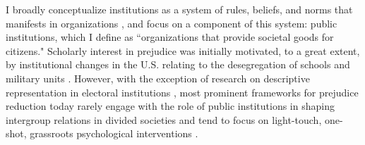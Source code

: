 \documentclass[12pt]{article}
\theoremstyle{plain}
\begin{document}






I broadly conceptualize institutions as a system of rules, beliefs, and norms that manifests in organizations \citep{Greif:2006vz}, and focus on a component of this system: public institutions, which I define as ``organizations that provide societal goods for citizens." Scholarly interest in prejudice was initially motivated, to a great extent, by institutional changes in the U.S. relating to the desegregation of schools and military units \citep{Allport1954}. However, with the exception of research on descriptive representation in electoral institutions \citep{Chauchard:2014aa,Chauchard:2017aa}, most prominent frameworks for prejudice reduction today rarely engage with the role of public institutions in shaping intergroup relations in divided societies and tend to focus on light-touch, one-shot, grassroots psychological interventions \citep{Paluck:2020aa}.%
\end{document}
